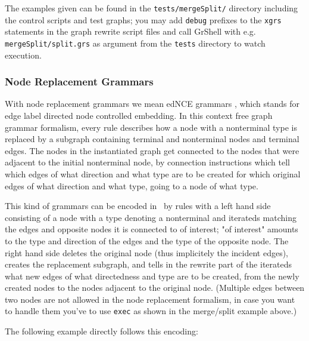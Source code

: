 The examples given can be found in the \texttt{tests/mergeSplit/} directory including the control scripts and test graphs; you may add \texttt{debug} prefixes to the \texttt{xgrs} statements in the graph rewrite script files and call GrShell with e.g. \texttt{mergeSplit/split.grs} as argument from the \texttt{tests} directory to watch execution.

\subsubsection*{Node Replacement Grammars}
With node replacement grammars we mean edNCE grammars \cite{NodeReplacement}, which stands for edge label directed node controlled embedding. In this context free graph grammar formalism, every rule describes how a node with a nonterminal type is replaced by a subgraph containing terminal and nonterminal nodes and terminal edges. The nodes in the instantiated graph get connected to the nodes that were adjacent to the initial nonterminal node, by connection instructions which tell which edges of what direction and what type are to be created for which original edges of what direction and what type, going to a node of what type. 

This kind of grammars can be encoded in \GrG~by rules with a left hand side consisting of a node with a type denoting a nonterminal and iterateds matching the edges and opposite nodes it is connected to of interest; "of interest" amounts to the type and direction of the edges and the type of the opposite node. The right hand side deletes the original node (thus implicitely the incident edges), creates the replacement subgraph, and tells in the rewrite part of the iterateds what new edges of what directedness and type are to be created, from the newly created nodes to the nodes adjacent to the original node. (Multiple edges between two nodes are not allowed in the node replacement formalism, in case you want to handle them you've to use \texttt{exec} as shown in the merge/split example above.) 

The following example directly follows this encoding:

